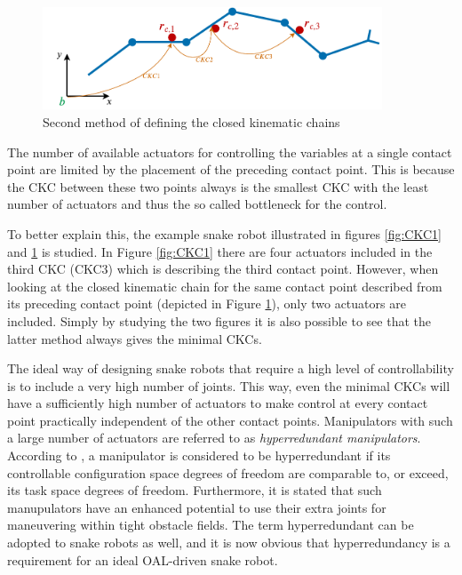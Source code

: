 \begin{figure}[h!]
    \centering
    \includegraphics[width=0.9\textwidth]{figures/theory/CKC2.pdf}
    \caption{Second method of defining the closed kinematic chains}
    \label{fig:CKC2}
\end{figure}

The number of available actuators for controlling the variables at a single contact point are limited by the placement of the preceding contact point. This is because the CKC between these two points always is the smallest CKC with the least number of actuators and thus the so called bottleneck for the control.

To better explain this, the example snake robot illustrated in figures \ref{fig:CKC1} and \ref{fig:CKC2} is studied. In Figure \ref{fig:CKC1} there are four actuators included in the third CKC (CKC3) which is describing the third contact point. However, when looking at the closed kinematic chain for the same contact point described from its preceding contact point (depicted in Figure \ref{fig:CKC2}), only two actuators are included. Simply by studying the two figures it is also possible to see that the latter method always gives the minimal CKCs.

The ideal way of designing snake robots that require a high level of controllability is to include a very high number of joints. This way, even the minimal CKCs will have a sufficiently high number of actuators to make control at every contact point practically independent of the other contact points. Manipulators with such a large number of actuators are referred to as \textit{hyperredundant manipulators}. According to \cite{chiaverini2008kinematically}, a manipulator is considered to be hyperredundant if its controllable configuration space degrees of freedom are comparable to, or exceed, its task space degrees of freedom. Furthermore, it is stated that such manupulators have an enhanced potential to use their extra joints for maneuvering within tight obstacle fields. The term hyperredundant can be adopted to snake robots as well, and it is now obvious that hyperredundancy is a requirement for an ideal OAL-driven snake robot.

